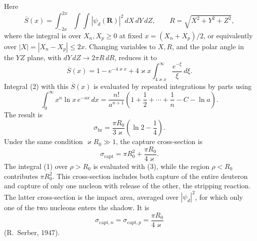 Here
\[
 \overline S(x)=\int_{-2x}^{2x}\!\int\!\int|\psi_d(\mathbf R)|^2\,dX\,dY\,dZ,
 \qquad R=\sqrt{X^2+Y^2+Z^2},
\]
where the integral is over $X_n,X_p\geqslant0$ at fixed $x=(X_n+X_p)/2$, or equivalently over $|X|=|X_n-X_p|\leqslant2x$. Changing variables to $X,R$, and the polar angle in the $YZ$ plane, with $dY\,dZ\to2\pi R\,dR$, reduces it to
\begin{equation}
 \overline S(x)=1-e^{-4\varkappa x}+4\varkappa x\int_{4\varkappa x}^{\infty}\frac{e^{-\xi}}\xi\,d\xi.
 \tag{3}
\end{equation}
Integral (2) with this $\overline S(x)$ is evaluated by repeated integrations by parts using
\[
 \int_0^\infty x^n\ln x\,e^{-ax}\,dx
 =\frac{n!}{a^{n+1}}\left(1+\frac12+\cdots+\frac1n-C-\ln a\right).
\]
The result is
\[
 \sigma_{\mathrm{br}}=\frac{\pi R_0}{3\varkappa}\left(\ln2-\frac14\right).
\]
Under the same condition $\varkappa R_0\gg1$, the capture cross-section is
\[
 \sigma_{\mathrm{capt}}=\pi R_0^2+\frac{\pi R_0}{4\varkappa}.
\]
The integral (1) over $\rho>R_0$ is evaluated with (3), while the region $\rho<R_0$ contributes $\pi R_0^2$. This cross-section includes both capture of the entire deuteron and capture of only one nucleon with release of the other, the stripping reaction. The latter cross-section is the impact area, averaged over $|\psi_d|^2$, for which only one of the two nucleons enters the shadow. It is
\[
 \sigma_{\mathrm{capt},n}=\sigma_{\mathrm{capt},p}=\frac{\pi R_0}{4\varkappa}
\]
(R.~Serber, 1947).
